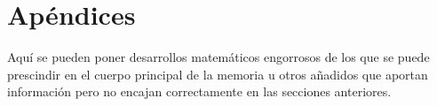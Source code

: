 \documentclass[11pt,a4paper,spanish]{book}
\begin{document}
% 
%

\appendix
\chapter{Apéndices}

Aquí se pueden poner desarrollos matemáticos engorrosos de los que se puede prescindir en el cuerpo principal de la memoria u otros añadidos que aportan información pero no encajan correctamente en las secciones anteriores.
\end{document}
